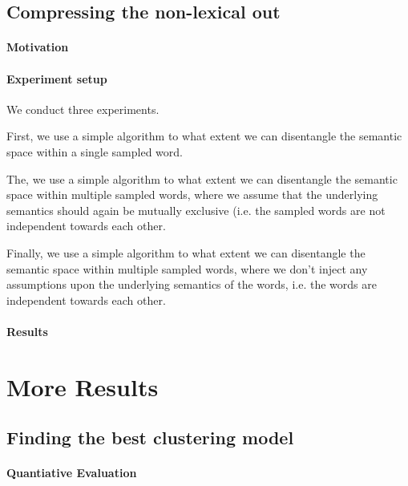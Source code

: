 \documentclass[a4paper,12pt,twoside,openright]{report}
\begin{document}
\section{Compressing the non-lexical out}
\subsubsection{Motivation}
\subsubsection{Experiment setup}


We conduct three experiments.

First, we use a simple algorithm to what extent we can disentangle the semantic space within a single sampled word.

The, we use a simple algorithm to what extent we can disentangle the semantic space within multiple sampled words, where we assume that the underlying semantics should again be mutually exclusive (i.e. the sampled words are not independent towards each other.

Finally, we use a simple algorithm to what extent we can disentangle the semantic space within multiple sampled words, where we don't inject any assumptions upon the underlying semantics of the words, i.e. the words are independent towards each other.


\subsubsection{Results}




\chapter{More Results}

\section{Finding the best clustering model}\label{section:more_clustering_results}

\subsubsection{Quantiative Evaluation}
\end{document}
